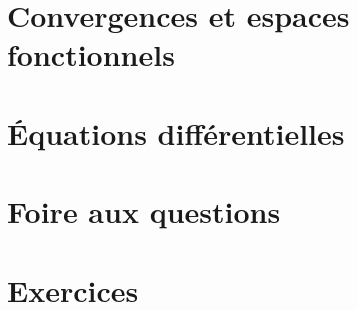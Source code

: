

\chapter{Convergences et espaces fonctionnels}
	

\chapter{Équations différentielles}
	


\chapter{Foire aux questions}
	

\chapter{Exercices}
	
	
